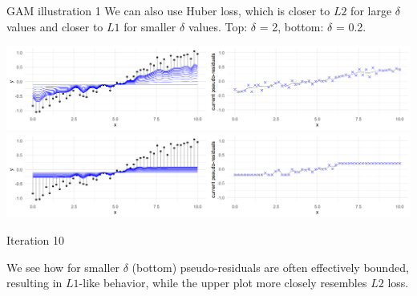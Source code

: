 \begin{frame}{GAM illustration 1}
We can also use Huber loss, which is closer to $L2$ for large $\delta$ values and closer to $L1$ for 
smaller $\delta$ values. Top: $\delta$ = 2, bottom: $\delta$ = 0.2.

\vfill

\includegraphics[width=\textwidth]{figure/illustration_gaussian_huber_2_10.png}
\includegraphics[width=\textwidth]{figure/illustration_gaussian_huber_02_10.png}

\vfill

Iteration 10

\vfill

\footnotesize
We see how for smaller $\delta$ (bottom) pseudo-residuals are often effectively
bounded, resulting in $L1$-like behavior, while the upper plot more closely 
resembles $L2$ loss.

\end{frame}


